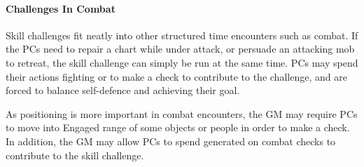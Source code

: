 \begin{multicols}{2}
\paragraph{Challenges In Combat}
Skill challenges fit neatly into other structured time encounters such as combat. If the PCs need to repair
a chart while under attack, or persuade an attacking mob to retreat, the skill challenge can simply be run at
the same time. PCs may spend their actions fighting or to make a check to contribute to the challenge, and are
forced to balance self-defence and achieving their goal.

As positioning is more important in combat encounters, the GM may require PCs to move into Engaged range of
some objects or people in order to make a check. In addition, the GM may allow PCs to spend \triumph generated
on combat checks to contribute to the skill challenge.

\end{multicols}

